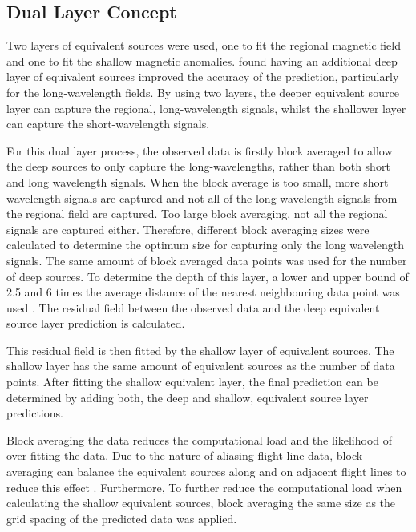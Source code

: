 \subsection{Dual Layer Concept}
Two layers of equivalent sources were used, one to fit the regional magnetic field and one to fit the shallow magnetic anomalies. \citep{Li2019} found having an additional deep layer of equivalent sources improved the accuracy of the prediction, particularly for the long‐wavelength fields. By using two layers, the deeper equivalent source layer can capture the regional, long-wavelength signals, whilst the shallower layer can capture the short-wavelength signals.

For this dual layer process, the observed data is firstly block averaged to allow the deep sources to only capture the long-wavelengths, rather than both short and long wavelength signals. When the block average is too small, more short wavelength signals are captured and not all of the long wavelength signals from the regional field are captured. Too large block averaging, not all the regional signals are captured either. Therefore, different block averaging sizes were calculated to determine the optimum size for capturing only the long wavelength signals. The same amount of block averaged data points was used for the number of deep sources. To determine the depth of this layer, a lower and upper bound of 2.5 and 6 times the average distance of the nearest neighbouring data point was used \citep{Dampney1969}. The residual field between the observed data and the deep equivalent source layer prediction is calculated.

This residual field is then fitted by the shallow layer of equivalent sources. The shallow layer has the same amount of equivalent sources as the number of data points. After fitting the shallow equivalent layer, the final prediction can be determined by adding both, the deep and shallow, equivalent source layer predictions.

Block averaging the data reduces the computational load and the likelihood of over-fitting the data. Due to the nature of aliasing flight line data, block averaging can balance the equivalent sources along and on adjacent flight lines to reduce this effect \citep{SolerUieda2021}. Furthermore, To further reduce the computational load when calculating the shallow equivalent sources, block averaging the same size as the grid spacing of the predicted data was applied.

